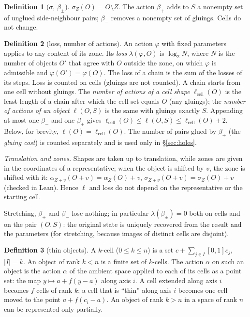 \documentclass[11pt,a4paper]{article}
\theoremstyle{plain}
\theoremstyle{definition}
\newtheorem{definition}{Definition}
\theoremstyle{remark}
\newcommand{\lo}{\lambda}
\begin{document}
\begin{definition}[$\sigma$, $\beta_\pm$]
$\sigma_Z(O)=O\setminus Z$. The action $\beta_+$ adds to $S$ a nonempty set of unglued side-neighbour pairs; $\beta_-$ removes a nonempty set of gluings. Cells do not change.
\end{definition}

\begin{definition}[loss, number of actions]
An action $\varphi$ with fixed parameters applies to any content of its zone. Its \emph{loss} $\lo(\varphi,O)$ is $\log_2 N$, where $N$ is the number of objects $O'$ that agree with $O$ outside the zone, on which $\varphi$ is admissible and $\varphi(O')=\varphi(O)$. The loss of a chain is the sum of the losses of its steps. Loss is counted on cells (gluings are not counted). A chain starts from one cell without gluings. The \emph{number of actions of a cell shape} $\ell_{\mathrm{cell}}(O)$ is the least length of a chain after which the cell set equals $O$ (any gluings); the \emph{number of actions of an object} $\ell(O,S)$ is the same with gluings exactly $S$. Appending at most one $\beta_-$ and one $\beta_+$ gives $\ell_{\mathrm{cell}}(O)\le\ell(O,S)\le\ell_{\mathrm{cell}}(O)+2$. Below, for brevity, $\ell(O)=\ell_{\mathrm{cell}}(O)$. The number of pairs glued by $\beta_+$ (the \emph{gluing cost}) is counted separately and is used only in §\ref{sec:holes}.

\emph{Translation and zones.} Shapes are taken up to translation, while zones are given in the coordinates of a representative; when the object is shifted by $v$, the zone is shifted with it: $\alpha_{Z+v}(O+v)=\alpha_Z(O)+v$, $\sigma_{Z+v}(O+v)=\sigma_Z(O)+v$ (checked in Lean). Hence $\ell$ and loss do not depend on the representative or the starting cell.
\end{definition}

Stretching, $\beta_+$ and $\beta_-$ lose nothing; in particular $\lambda(\beta_\pm)=0$ both on cells and on the pair $(O,S)$: the original state is uniquely recovered from the result and the parameters (for stretching, because images of distinct cells are disjoint).

\begin{definition}[thin objects]
A $k$-cell ($0\le k\le n$) is a set $c+\sum_{j\in I}[0,1]e_j$, $|I|=k$. An object of rank $k<n$ is a finite set of $k$-cells. The action $\alpha$ on such an object is the action $\alpha$ of the ambient space applied to each of its cells as a point set: the map $y\mapsto a+f(y-a)$ along axis $i$. A cell extended along axis $i$ becomes $f$ cells of rank $k$; a cell that is ``thin'' along axis $i$ becomes one cell moved to the point $a+f(c_i-a)$. An object of rank $k>n$ in a space of rank $n$ can be represented only partially.
\end{definition}
\end{document}
